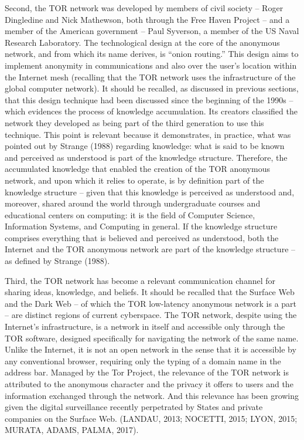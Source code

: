 Second, the TOR network was developed by members of civil society -- Roger Dingledine and Nick Mathewson, both through the Free Haven Project -- and a member of the American government -- Paul Syverson, a member of the US Naval Research Laboratory. The technological design at the core of the anonymous network, and from which its name derives, is ``onion routing.'' This design aims to implement anonymity in communications and also over the user's location within the Internet mesh (recalling that the TOR network uses the infrastructure of the global computer network). It should be recalled, as discussed in previous sections, that this design technique had been discussed since the beginning of the 1990s -- which evidences the process of knowledge accumulation. Its creators classified the network they developed as being part of the third generation to use this technique. This point is relevant because it demonstrates, in practice, what was pointed out by Strange (1988) regarding knowledge: what is said to be known and perceived as understood is part of the knowledge structure. Therefore, the accumulated knowledge that enabled the creation of the TOR anonymous network, and upon which it relies to operate, is by definition part of the knowledge structure -- given that this knowledge is perceived as understood and, moreover, shared around the world through undergraduate courses and educational centers on computing: it is the field of Computer Science, Information Systems, and Computing in general. If the knowledge structure comprises everything that is believed and perceived as understood, both the Internet and the TOR anonymous network are part of the knowledge structure -- as defined by Strange (1988).

Third, the TOR network has become a relevant communication channel for sharing ideas, knowledge, and beliefs. It should be recalled that the Surface Web and the Dark Web -- of which the TOR low-latency anonymous network is a part -- are distinct regions of current cyberspace. The TOR network, despite using the Internet's infrastructure, is a network in itself and accessible only through the TOR software, designed specifically for navigating the network of the same name. Unlike the Internet, it is not an open network in the sense that it is accessible by any conventional browser, requiring only the typing of a domain name in the address bar. Managed by the Tor Project, the relevance of the TOR network is attributed to the anonymous character and the privacy it offers to users and the information exchanged through the network. And this relevance has been growing given the digital surveillance recently perpetrated by States and private companies on the Surface Web. (LANDAU, 2013; NOCETTI, 2015; LYON, 2015; MURATA, ADAMS, PALMA, 2017).

